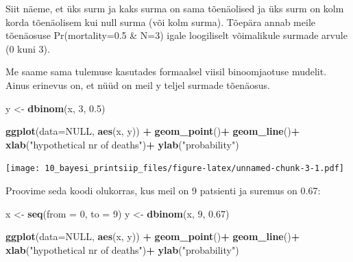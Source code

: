 \documentclass[]{book}
\newenvironment{Shaded}{\begin{snugshade}}{\end{snugshade}}
\newcommand{\DataTypeTok}[1]{\textcolor[rgb]{0.13,0.29,0.53}{#1}}
\newcommand{\DecValTok}[1]{\textcolor[rgb]{0.00,0.00,0.81}{#1}}
\newcommand{\FloatTok}[1]{\textcolor[rgb]{0.00,0.00,0.81}{#1}}
\newcommand{\KeywordTok}[1]{\textcolor[rgb]{0.13,0.29,0.53}{\textbf{#1}}}
\newcommand{\NormalTok}[1]{#1}
\newcommand{\OperatorTok}[1]{\textcolor[rgb]{0.81,0.36,0.00}{\textbf{#1}}}
\newcommand{\OtherTok}[1]{\textcolor[rgb]{0.56,0.35,0.01}{#1}}
\newcommand{\StringTok}[1]{\textcolor[rgb]{0.31,0.60,0.02}{#1}}
\begin{document}
Siit näeme, et üks surm ja kaks surma on sama tõenäolised ja üks surm on kolm korda tõenäolisem kui null surma (või kolm surma).
Tõepära annab meile tõenäosuse Pr(mortality=0.5 \& N=3) igale loogiliselt võimalikule surmade arvule (0 kuni 3).

Me saame sama tulemuse kasutades formaalsel viisil binoomjaotuse mudelit. Ainus erinevus on, et nüüd on meil y teljel surmade tõenäosus.

\begin{Shaded}
\begin{Highlighting}[]
\NormalTok{y <-}\StringTok{ }\KeywordTok{dbinom}\NormalTok{(x, }\DecValTok{3}\NormalTok{, }\FloatTok{0.5}\NormalTok{)}

\KeywordTok{ggplot}\NormalTok{(}\DataTypeTok{data=}\OtherTok{NULL}\NormalTok{, }\KeywordTok{aes}\NormalTok{(x, y)) }\OperatorTok{+}\StringTok{ }
\StringTok{  }\KeywordTok{geom_point}\NormalTok{()}\OperatorTok{+}
\StringTok{  }\KeywordTok{geom_line}\NormalTok{()}\OperatorTok{+}
\StringTok{  }\KeywordTok{xlab}\NormalTok{(}\StringTok{"hypothetical nr of deaths"}\NormalTok{)}\OperatorTok{+}\StringTok{ }
\StringTok{  }\KeywordTok{ylab}\NormalTok{(}\StringTok{"probability"}\NormalTok{)}
\end{Highlighting}
\end{Shaded}

\texttt{[image: 10\_bayesi\_printsiip\_files/figure-latex/unnamed-chunk-3-1.pdf]}

Proovime seda koodi olukorras, kus meil on 9 patsienti ja suremus on 0.67:

\begin{Shaded}
\begin{Highlighting}[]
\NormalTok{x <-}\StringTok{ }\KeywordTok{seq}\NormalTok{(}\DataTypeTok{from =} \DecValTok{0}\NormalTok{, }\DataTypeTok{to =} \DecValTok{9}\NormalTok{)}
\NormalTok{y <-}\StringTok{ }\KeywordTok{dbinom}\NormalTok{(x, }\DecValTok{9}\NormalTok{, }\FloatTok{0.67}\NormalTok{)}

\KeywordTok{ggplot}\NormalTok{(}\DataTypeTok{data=}\OtherTok{NULL}\NormalTok{, }\KeywordTok{aes}\NormalTok{(x, y)) }\OperatorTok{+}\StringTok{ }
\StringTok{  }\KeywordTok{geom_point}\NormalTok{()}\OperatorTok{+}
\StringTok{  }\KeywordTok{geom_line}\NormalTok{()}\OperatorTok{+}
\StringTok{  }\KeywordTok{xlab}\NormalTok{(}\StringTok{"hypothetical nr of deaths"}\NormalTok{)}\OperatorTok{+}\StringTok{ }
\StringTok{  }\KeywordTok{ylab}\NormalTok{(}\StringTok{"probability"}\NormalTok{)}
\end{Highlighting}
\end{Shaded}
\end{document}
